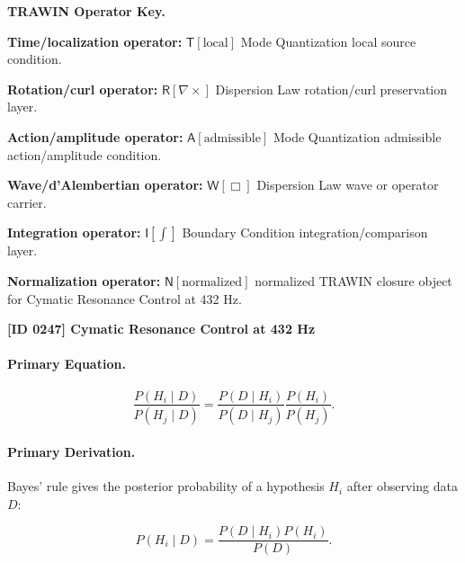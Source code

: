\par\vspace{0.45\baselineskip}
\noindent\begin{minipage}[t]{\linewidth}
\begingroup
\small
\raggedright
\textbf{TRAWIN Operator Key.}\par
\noindent\textbf{Time/localization operator:} $\mathsf{T}\!\left[\mathrm{local}\right]$ Mode Quantization local source condition.\par
\noindent\textbf{Rotation/curl operator:} $\mathsf{R}\!\left[\nabla\times\right]$ Dispersion Law rotation/curl preservation layer.\par
\noindent\textbf{Action/amplitude operator:} $\mathsf{A}\!\left[\mathrm{admissible}\right]$ Mode Quantization admissible action/amplitude condition.\par
\noindent\textbf{Wave/d'Alembertian operator:} $\mathsf{W}\!\left[\Box\right]$ Dispersion Law wave or operator carrier.\par
\noindent\textbf{Integration operator:} $\mathsf{I}\!\left[\int\right]$ Boundary Condition integration/comparison layer.\par
\noindent\textbf{Normalization operator:} $\mathsf{N}\!\left[\mathrm{normalized}\right]$ normalized TRAWIN closure object for Cymatic Resonance Control at 432 Hz.\par
\endgroup
\end{minipage}

\clearpage
\noindent\textbf{[ID 0247] Cymatic Resonance Control at 432 Hz}\par
\vspace{0.35em}
\paragraph{Primary Equation.}
\begin{equation}
\frac{P(H_i\mid D)}
{P(H_j\mid D)}
=
\frac{P(D\mid H_i)}
{P(D\mid H_j)}
\frac{P(H_i)}
{P(H_j)} .
\end{equation}

\paragraph{Primary Derivation.}
Bayes' rule gives the posterior probability of a hypothesis $H_i$ after observing data $D$:

\begin{equation}
P(H_i\mid D)
=
\frac{P(D\mid H_i)P(H_i)}
{P(D)} .
\end{equation}

